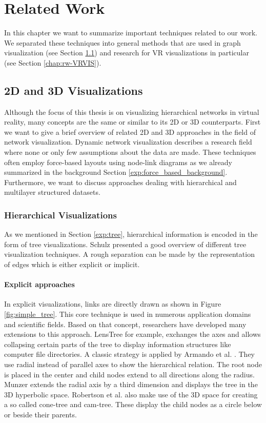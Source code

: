 \chapter{Related Work}

In this chapter we want to summarize important techniques related to our work. We separated these techniques into general methods that are used in graph visualization (see Section \ref{chap:rw-2d3dLayout}) and research for VR visualizations in particular (see Section \ref{chap:rw-VRVIS}). 
\section{2D and 3D Visualizations}
\label{chap:rw-2d3dLayout}
Although the focus of this thesis is on visualizing hierarchical networks in virtual reality, many concepts are the same or similar to its 2D or 3D counterparts. First we want to give a brief overview of related 2D and 3D approaches in the field of network visualization.
Dynamic network visualization describes a research field where none or only few assumptions about the data are made. These techniques often employ force-based layouts using node-link diagrams as we already summarized in the background Section \ref{exp:force_based_background}. Furthermore, we want to discuss approaches dealing with hierarchical and multilayer structured datasets.

\subsection{Hierarchical Visualizations}

As we mentioned in Section \ref{exp:tree}, hierarchical information is encoded in the form of tree visualizations.
Schulz \cite{schulz_treevisnet_2011} presented a good overview of different tree visualization techniques. A rough separation can be made by the representation of edges which is either explicit or implicit. 

\subsubsection{Explicit approaches}
In explicit visualizations, links are directly drawn as shown in Figure \ref{fig:simple_tree}. This core technique is used in numerous application domains and scientific fields. Based on that concept, researchers have developed many extensions to this approach.
LensTree \cite{song_lenstree_2006} for example, exchanges the axes and allows collapsing certain parts of the tree to display information structures like computer file directories. 
A classic strategy is applied by Armando et al. \cite{arce-orozco_radial_2017}. They use radial instead of parallel axes to show the hierarchical relation. The root node is placed in the center and child nodes extend to all directions along the radius.
Munzer \cite{munzner_h3_1997} extends the radial axis by a third dimension and displays the tree in the 3D hyperbolic space.
Robertson et al. \cite{robertson_cone_1991} also make use of the 3D space for creating a so called cone-tree and cam-tree. These display the child nodes as a circle below or beside their parents.  

